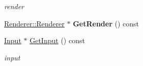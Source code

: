 \begin{Indent}{\bf }\par
{\em \label{_amgrpd41d8cd98f00b204e9800998ecf8427e}
 render }\begin{DoxyCompactItemize}
\item 
\hypertarget{classPlatform_1_1Window_ac65a2e9e68bd74c890ccb4955cf964c0}{
\hyperlink{classPlatform_1_1Renderer_1_1Renderer}{Renderer::Renderer} $\ast$ {\bfseries GetRender} () const }
\label{classPlatform_1_1Window_ac65a2e9e68bd74c890ccb4955cf964c0}

\item 
\hypertarget{classPlatform_1_1Window_aeba6c11cd276c218c409f690d470dcde}{
\hyperlink{classPlatform_1_1Input}{Input} $\ast$ \hyperlink{classPlatform_1_1Window_aeba6c11cd276c218c409f690d470dcde}{GetInput} () const }
\label{classPlatform_1_1Window_aeba6c11cd276c218c409f690d470dcde}

\begin{DoxyCompactList}\small\item\em input \item\end{DoxyCompactList}\end{DoxyCompactItemize}
\end{Indent}
